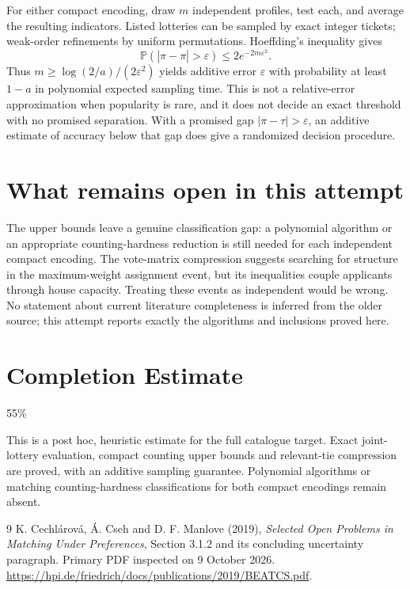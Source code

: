 \documentclass[11pt]{article}
\newcommand{\Prb}{\mathbb P}
\begin{document}
For either compact encoding, draw $m$ independent profiles, test each, and average the resulting indicators. Listed lotteries can be sampled by exact integer tickets; weak-order refinements by uniform permutations. Hoeffding's inequality gives
\[
 \Prb(|\widehat\pi-\pi|>\varepsilon)\leq2e^{-2m\varepsilon^2}.
\]
Thus $m\geq\log(2/a)/(2\varepsilon^2)$ yields additive error $\varepsilon$ with probability at least $1-a$ in polynomial expected sampling time. This is not a relative-error approximation when popularity is rare, and it does not decide an exact threshold with no promised separation. With a promised gap $|\pi-\tau|>\varepsilon$, an additive estimate of accuracy below that gap does give a randomized decision procedure.

\section*{What remains open in this attempt}
The upper bounds leave a genuine classification gap: a polynomial algorithm or an appropriate counting-hardness reduction is still needed for each independent compact encoding. The vote-matrix compression suggests searching for structure in the maximum-weight assignment event, but its inequalities couple applicants through house capacity. Treating these events as independent would be wrong. No statement about current literature completeness is inferred from the older source; this attempt reports exactly the algorithms and inclusions proved here.

\section{Completion Estimate}
55\%

This is a post hoc, heuristic estimate for the full catalogue target.
Exact joint-lottery evaluation, compact counting upper bounds and relevant-tie compression are proved, with an additive sampling guarantee. Polynomial algorithms or matching counting-hardness classifications for both compact encodings remain absent.

\begin{thebibliography}{9}
 K. Cechl\'arov\'a, \'A. Cseh and D. F. Manlove (2019), \emph{Selected Open Problems in Matching Under Preferences}, Section 3.1.2 and its concluding uncertainty paragraph. Primary PDF inspected on 9 October 2026. \url{https://hpi.de/friedrich/docs/publications/2019/BEATCS.pdf}.
\end{thebibliography}
\end{document}
